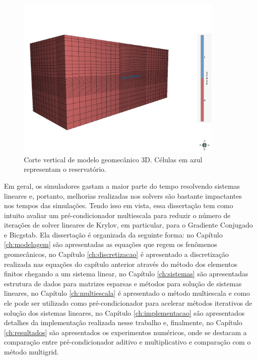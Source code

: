 \begin{figure}[!htbp]
\centering
\includegraphics[width=10cm]{chap00/figs/Geresim(0054).png}
\caption{Corte vertical de modelo geomecânico 3D. Células em azul representam o reservatório.}
\label{fig:modelogeomec3d}
\end{figure}

Em geral, os simuladores gastam a maior parte do tempo resolvendo sistemas lineares e, portanto, melhorias realizadas nos solvers são bastante impactantes nos tempos das simulações. Tendo isso em vista, essa dissertação tem como intuito avaliar um pré-condicionador multiescala para reduzir o número de iterações de solver lineares de Krylov, em particular, para o Gradiente Conjugado e Bicgstab. Ela dissertação é organizada da seguinte forma: no Capítulo \ref{ch:modelagem} são apresentadas as equações que regem os fenômenos geomecânicos, no Capítulo \ref{ch:discretizacao} é apresentado a discretização realizada nas equações do capítulo anterior através do método dos elementos finitos chegando a um sistema linear, no Capítulo \ref{ch:sistemas} são apresentadas estrutura de dados para matrizes esparsas e métodos para solução de sistemas lineares, no Capítulo \ref{ch:multiescala} é apresentado o método multiescala e como ele pode ser utilizado como pré-condicionador para acelerar métodos iterativos de solução dos sistemas lineares, no Capítulo \ref{ch:implementacao} são apresentados detalhes da implementação realizada nesse trabalho e, finalmente, no Capítulo \ref{ch:resultados} são apresentados os experimentos numéricos, onde se destacam a comparação entre pré-condicionador aditivo e multiplicativo e comparação com o método multigrid. 




